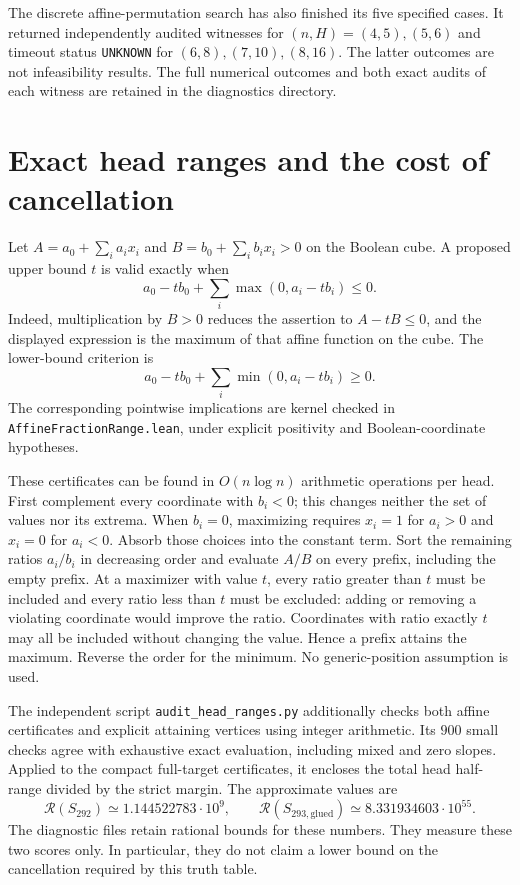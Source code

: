 \documentclass[11pt]{article}
\begin{document}
The discrete affine-permutation search has also finished its five
specified cases. It returned independently audited witnesses for
$(n,H)=(4,5),(5,6)$ and timeout status \texttt{UNKNOWN} for
$(6,8),(7,10),(8,16)$. The latter outcomes are not infeasibility results.
The full numerical outcomes and both exact audits of each witness are
retained in the diagnostics directory.

\section{Exact head ranges and the cost of cancellation}

Let $A=a_0+\sum_i a_ix_i$ and $B=b_0+\sum_i b_ix_i>0$
on the Boolean cube. A proposed upper bound $t$ is valid exactly when
\[
 a_0-tb_0+\sum_i\max(0,a_i-tb_i)\le0.
\]
Indeed, multiplication by $B>0$ reduces the assertion to
$A-tB\le0$, and the displayed expression is the maximum of that
affine function on the cube. The lower-bound criterion is
\[
 a_0-tb_0+\sum_i\min(0,a_i-tb_i)\ge0.
\]
The corresponding pointwise implications are kernel checked in
\texttt{AffineFractionRange.lean}, under explicit positivity and
Boolean-coordinate hypotheses.

These certificates can be found in $O(n\log n)$ arithmetic operations
per head. First complement every coordinate with $b_i<0$; this changes
neither the set of values nor its extrema. When $b_i=0$, maximizing
requires $x_i=1$ for $a_i>0$ and $x_i=0$ for $a_i<0$. Absorb those
choices into the constant term. Sort the remaining ratios $a_i/b_i$
in decreasing order and evaluate $A/B$ on every prefix, including the
empty prefix. At a maximizer with value $t$, every ratio greater than
$t$ must be included and every ratio less than $t$ must be excluded:
adding or removing a violating coordinate would improve the ratio.
Coordinates with ratio exactly $t$ may all be included without changing
the value. Hence a prefix attains the maximum. Reverse the order for
the minimum. No generic-position assumption is used.

The independent script \texttt{audit\_head\_ranges.py} additionally
checks both affine certificates and explicit attaining vertices using
integer arithmetic. Its $900$ small checks agree with exhaustive exact
evaluation, including mixed and zero slopes. Applied to the compact
full-target certificates, it encloses the total head half-range divided
by the strict margin. The approximate values are
\[
 \mathcal R(S_{292})\simeq1.144522783\cdot10^9,
 \qquad
 \mathcal R(S_{293,\mathrm{glued}})\simeq8.331934603\cdot10^{55}.
\]
The diagnostic files retain rational bounds for these numbers. They
measure these two scores only. In particular, they do not claim a
lower bound on the cancellation required by this truth table.
\end{document}
